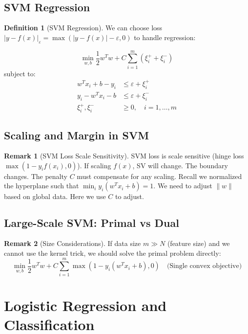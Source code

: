 \documentclass[12pt,a4paper]{article}
\theoremstyle{definition}
\newtheorem{definition}{Definition}[section]
\newtheorem{remark}{Remark}[section]
\begin{document}
\subsection{SVM Regression}

\begin{definition}[SVM Regression]
We can choose loss $|y - f(x)|_\varepsilon = \max(|y - f(x)| - \varepsilon, 0)$ to handle regression:

\[
\min_{w,b} \frac{1}{2}w^T w + C \sum_{i=1}^m (\xi_i^+ + \xi_i^-)
\]
subject to:
\begin{align*}
w^T x_i + b - y_i &\leq \varepsilon + \xi_i^+ \\
y_i - w^T x_i - b &\leq \varepsilon + \xi_i^- \\
\xi_i^+, \xi_i^- &\geq 0, \quad i = 1, \ldots, m
\end{align*}
\end{definition}

\subsection{Scaling and Margin in SVM}

\begin{remark}[SVM Loss Scale Sensitivity]
SVM loss is scale sensitive (hinge loss $\max(1 - y_i f(x_i), 0)$). If scaling $f(x)$, SV will change. The boundary changes. The penalty $C$ must compensate for any scaling. Recall we normalized the hyperplane such that $\min_i y_i(w^T x_i + b) = 1$. We need to adjust $\|w\|$ based on global data. Here we use $C$ to adjust.
\end{remark}

\subsection{Large-Scale SVM: Primal vs Dual}

\begin{remark}[Size Considerations]
If data size $m \gg N$ (feature size) and we cannot use the kernel trick, we should solve the primal problem directly:
\[
\min_{w,b} \frac{1}{2}w^T w + C \sum_{i=1}^m \max(1 - y_i(w^T x_i + b), 0) \quad \text{(Single convex objective)}
\]
\end{remark}

\section{Logistic Regression and Classification}
\end{document}
